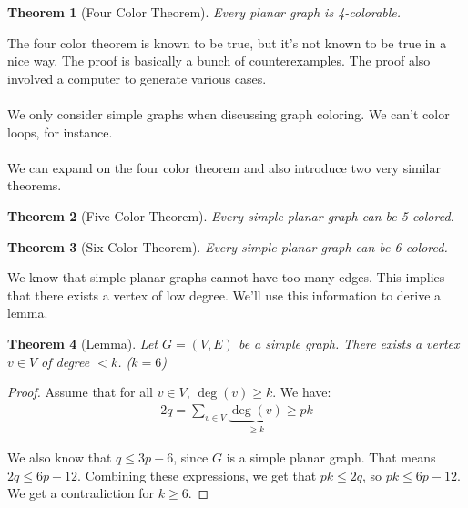 \documentclass[]{article}
\newtheorem*{theorem}{Theorem}
\theoremstyle{definition}
\newcommand{\lecture}[1]{\marginpar{{\footnotesize $\leftarrow$ \underline{#1}}}}
\begin{document}
			\begin{theorem}[Four Color Theorem]
				Every planar graph is 4-colorable.
			\end{theorem}
			
			The four color theorem is known to be true, but it's not known to be true in a nice way. The proof is basically a bunch of counterexamples. The proof also involved a computer to generate various cases. \lecture{March 22, 2013}
			\\ \\
			We only consider simple graphs when discussing graph coloring. We can't color loops, for instance.
			\\ \\
			We can expand on the four color theorem and also introduce two very similar theorems.
			
			\begin{theorem}[Five Color Theorem]
				Every simple planar graph can be 5-colored.
			\end{theorem}

			\begin{theorem}[Six Color Theorem]
				Every simple planar graph can be 6-colored.
			\end{theorem}

			We know that simple planar graphs cannot have too many edges. This implies that there exists a vertex of low degree. We'll use this information to derive a lemma.
			\begin{theorem}[Lemma]
				Let $G = (V, E)$ be a simple graph. There exists a vertex $v \in V$ of degree $< k$. ($k = 6$)
			\end{theorem}

			\begin{proof}
				Assume that for all $v \in V$, $\deg(v) \ge k$. We have:
				\begin{align*}
					2q = \sum_{v \in V} \underbrace{\deg(v)}_{\ge k} \ge pk
				\end{align*}

				We also know that $q \le 3p - 6$, since $G$ is a simple planar graph. That means $2q \le 6p - 12$. Combining these expressions, we get that $pk \le 2q$, so $pk \le 6p - 12$. We get a contradiction for $k \ge 6$.
			\end{proof}
\end{document}
